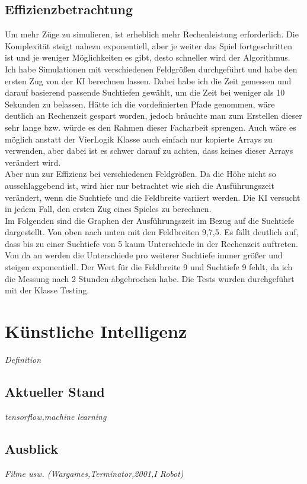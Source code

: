 \documentclass[12pt,a4paper,ngerman]{article}
\begin{document}
	\subsection{Effizienzbetrachtung}
	Um mehr Züge zu simulieren, ist erheblich mehr Rechenleistung erforderlich. Die Komplexität steigt nahezu exponentiell, aber je weiter das Spiel fortgeschritten ist und je weniger Möglichkeiten es gibt, desto schneller wird der Algorithmus. Ich habe Simulationen mit verschiedenen Feldgrößen durchgeführt und habe den ersten Zug von der KI berechnen lassen. Dabei habe ich die Zeit gemessen und darauf basierend passende Suchtiefen gewählt, um die Zeit bei weniger als 10 Sekunden zu belassen. Hätte ich die vordefinierten Pfade genommen, wäre deutlich an Rechenzeit gespart worden, jedoch bräuchte man zum Erstellen dieser sehr lange bzw. würde es den Rahmen dieser Facharbeit sprengen. Auch wäre es möglich anstatt der VierLogik Klasse auch einfach nur kopierte Arrays zu verwenden, aber dabei ist es schwer darauf zu achten, dass keines dieser Arrays verändert wird.\\
	Aber nun zur Effizienz bei verschiedenen Feldgrößen. Da die Höhe nicht so ausschlaggebend ist, wird hier nur betrachtet wie sich die Ausführungszeit verändert, wenn die Suchtiefe und die Feldbreite variiert werden. Die KI versucht in jedem Fall, den ersten Zug eines Spieles zu berechnen.\\
	Im Folgenden sind die Graphen der Ausführungszeit im Bezug auf die Suchtiefe dargestellt. Von oben nach unten mit den Feldbreiten 9,7,5. Es fällt deutlich auf, dass bis zu einer Suchtiefe von 5 kaum Unterschiede in der Rechenzeit auftreten. Von da an werden die Unterschiede pro weiterer Suchtiefe immer größer und steigen exponentiell. Der Wert für die Feldbreite 9 und Suchtiefe 9 fehlt, da ich die Messung nach 2 Stunden abgebrochen habe. Die Tests wurden durchgeführt mit der Klasse Testing.\\
	
		\centering
	
	\section{Künstliche Intelligenz}
	\textit{Definition}
	\subsection{Aktueller Stand}
	\textit{tensorflow,machine learning}
	\subsection{Ausblick}
	\textit{Filme usw. (Wargames,Terminator,2001,I Robot)}
	
\end{document}
